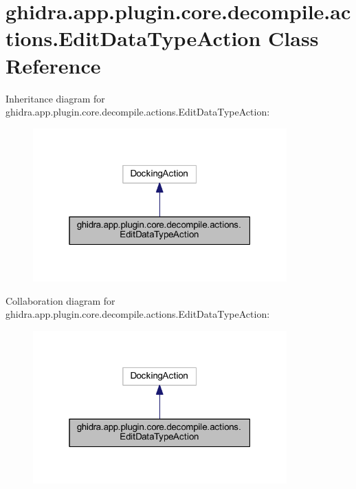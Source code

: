 \hypertarget{classghidra_1_1app_1_1plugin_1_1core_1_1decompile_1_1actions_1_1_edit_data_type_action}{}\section{ghidra.\+app.\+plugin.\+core.\+decompile.\+actions.\+Edit\+Data\+Type\+Action Class Reference}
\label{classghidra_1_1app_1_1plugin_1_1core_1_1decompile_1_1actions_1_1_edit_data_type_action}


Inheritance diagram for ghidra.\+app.\+plugin.\+core.\+decompile.\+actions.\+Edit\+Data\+Type\+Action\+:
\nopagebreak
\begin{figure}[H]
\begin{center}
\leavevmode
\includegraphics[width=277pt]{classghidra_1_1app_1_1plugin_1_1core_1_1decompile_1_1actions_1_1_edit_data_type_action__inherit__graph}
\end{center}
\end{figure}


Collaboration diagram for ghidra.\+app.\+plugin.\+core.\+decompile.\+actions.\+Edit\+Data\+Type\+Action\+:
\nopagebreak
\begin{figure}[H]
\begin{center}
\leavevmode
\includegraphics[width=277pt]{classghidra_1_1app_1_1plugin_1_1core_1_1decompile_1_1actions_1_1_edit_data_type_action__coll__graph}
\end{center}
\end{figure}
